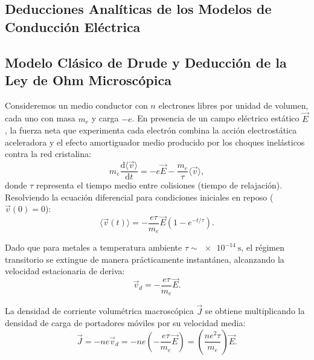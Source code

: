 
\begin{appendices}

\section{Deducciones Analíticas de los Modelos de Conducción Eléctrica}
\label{anexo:deducciones_teoricas}

\subsection{Modelo Clásico de Drude y Deducción de la Ley de Ohm Microscópica}
Consideremos un medio conductor con $n$ electrones libres por unidad de volumen, cada uno con masa $m_e$ y carga $-e$. En presencia de un campo eléctrico estático $\vec{E}$, la fuerza neta que experimenta cada electrón combina la acción electrostática aceleradora y el efecto amortiguador medio producido por los choques inelásticos contra la red cristalina:
\begin{equation}
    m_e \frac{\mathrm{d}\langle \vec{v} \rangle}{\mathrm{d}t} = -e\vec{E} - \frac{m_e}{\tau} \langle \vec{v} \rangle,
    \label{eq:anexo_drude_diff}
\end{equation}
donde $\tau$ representa el tiempo medio entre colisiones (tiempo de relajación). Resolviendo la ecuación diferencial para condiciones iniciales en reposo ($\vec{v}(0) = 0$):
\begin{equation}
    \langle \vec{v}(t) \rangle = -\frac{e\tau}{m_e}\vec{E} \left( 1 - e^{-t/\tau} \right).
\end{equation}

Dado que para metales a temperatura ambiente $\tau \sim \qty{e-14}{\second}$, el régimen transitorio se extingue de manera prácticamente instantánea, alcanzando la velocidad estacionaria de deriva:
\begin{equation}
    \vec{v}_d = -\frac{e\tau}{m_e}\vec{E}.
\end{equation}

La densidad de corriente volumétrica macroscópica $\vec{J}$ se obtiene multiplicando la densidad de carga de portadores móviles por su velocidad media:
\begin{equation}
    \vec{J} = -n e \vec{v}_d = -n e \left( -\frac{e\tau}{m_e}\vec{E} \right) = \left( \frac{n e^2 \tau}{m_e} \right) \vec{E}.
\end{equation}


\end{appendices}
